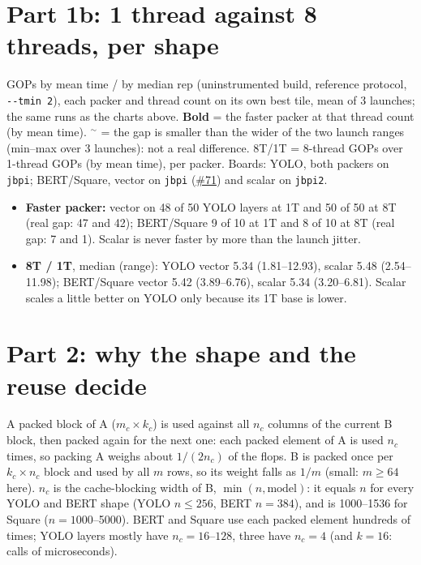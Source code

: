 \documentclass[10pt,a4paper]{article}
\newcommand{\iss}[1]{\href{https://github.com/JieGH/RVV_code_gen_via_MLIR_xDSL/issues/#1}{\##1}}
\begin{document}
\section*{Part 1b: 1 thread against 8 threads, per shape}
GOPs by mean time / by median rep (uninstrumented build, reference protocol, \texttt{-{}-tmin 2}), each packer and thread
count on its own best tile, mean of 3 launches; the same runs as the charts above. \textbf{Bold} = the faster packer at that
thread count (by mean time). $^{\sim}$ = the gap is smaller than the wider of the two launch ranges (min--max over 3
launches): not a real difference. 8T/1T = 8-thread GOPs over 1-thread GOPs (by mean time), per packer.
Boards: YOLO, both packers on \texttt{jbpi}; BERT/Square, vector on \texttt{jbpi} (\iss{71}) and scalar on \texttt{jbpi2}.


\begin{itemize}
  \item \textbf{Faster packer:} vector on 48 of 50 YOLO layers at 1T and 50 of 50 at 8T (real gap: 47 and 42); BERT/Square 9 of 10
        at 1T and 8 of 10 at 8T (real gap: 7 and 1). Scalar is never faster by more than the launch jitter.
  \item \textbf{8T / 1T}, median (range): YOLO vector 5.34 (1.81--12.93), scalar 5.48 (2.54--11.98); BERT/Square vector 5.42
        (3.89--6.76), scalar 5.34 (3.20--6.81). Scalar scales a little better on YOLO only because its 1T base is lower.
\end{itemize}

\section*{Part 2: why the shape and the reuse decide}
A packed block of A ($m_c\times k_c$) is used against all $n_c$ columns of the current B block, then packed again for
the next one: each packed element of A is used $n_c$ times, so packing A weighs about $1/(2n_c)$ of the flops. B is packed
once per $k_c\times n_c$ block and used by all $m$ rows, so its weight falls as $1/m$ (small: $m\ge64$ here). $n_c$ is
the cache-blocking width of B, $\min(n,\mathrm{model})$: it equals $n$ for every YOLO and BERT shape (YOLO $n\le256$, BERT
$n=384$), and is 1000--1536 for Square ($n=1000$--5000). BERT and Square use each packed element hundreds of times;
YOLO layers mostly have $n_c=16$--$128$, three have $n_c=4$ (and $k=16$: calls of
microseconds).
\end{document}
